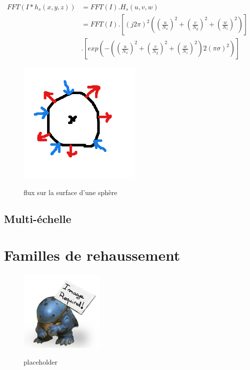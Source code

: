 \begin{align}
  FFT( I * h_s(x,y,z) ) &= FFT(I) . H_s(u,v,w) \\
                       &= FFT(I) . [ (j2 \pi)^2 ( (\frac{u}{N_x})^2 + (\frac{v}{N_y})^2 + (\frac{w}{N_z})^2 ) ] \\
                       & . [ exp( -( (\frac{u}{N_x})^2 + (\frac{v}{N_y})^2 + (\frac{w}{N_z})^2 ) 2(\pi\sigma)^2 ) ]
\end{align}

\begin{figure}
  \centering
  \includegraphics[height=6cm]{Images/flux.png}
  \label{fig:flux_sphere}
  \caption{flux sur la surface d'une sphère}
\end{figure}

\subsection{Multi-échelle}
\label{sec:EA:rehaussement:echelle:multiScale}



\section{Familles de rehaussement}
\label{sec:EA:rehaussement:famille}

\begin{figure}
  \centering
  \includegraphics[height=4cm]{Images/img_required.jpg}
  \label{fig:placeholder}
  \caption{placeholder}
\end{figure}


